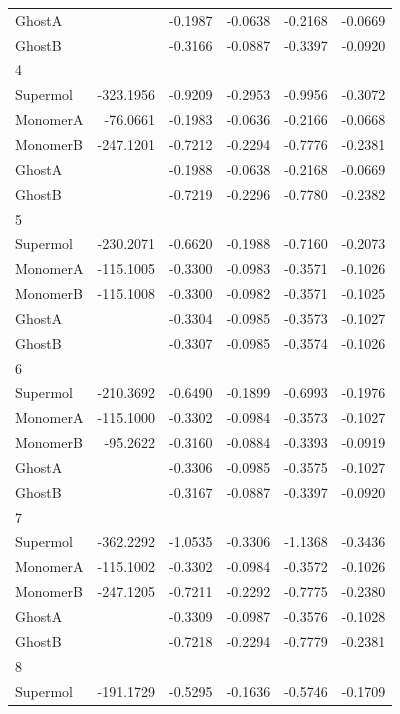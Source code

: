 \documentclass[journal=jctcce,manuscript=article]{achemso}
\begin{document}
\begin{spacing}{1}
\begin{longtable}{lRRRRR}
    GhostA &  & -0.1987 & -0.0638 & -0.2168 & -0.0669 \\
    GhostB &  & -0.3166 & -0.0887 & -0.3397 & -0.0920 \\
    4 &  &  &  &  &  \\
    Supermol & -323.1956 & -0.9209 & -0.2953 & -0.9956 & -0.3072 \\
    MonomerA & -76.0661 & -0.1983 & -0.0636 & -0.2166 & -0.0668 \\
    MonomerB & -247.1201 & -0.7212 & -0.2294 & -0.7776 & -0.2381 \\
    GhostA &  & -0.1988 & -0.0638 & -0.2168 & -0.0669 \\
    GhostB &  & -0.7219 & -0.2296 & -0.7780 & -0.2382 \\
    5 &  &  &  &  &  \\
    Supermol & -230.2071 & -0.6620 & -0.1988 & -0.7160 & -0.2073 \\
    MonomerA & -115.1005 & -0.3300 & -0.0983 & -0.3571 & -0.1026 \\
    MonomerB & -115.1008 & -0.3300 & -0.0982 & -0.3571 & -0.1025 \\
    GhostA &  & -0.3304 & -0.0985 & -0.3573 & -0.1027 \\
    GhostB &  & -0.3307 & -0.0985 & -0.3574 & -0.1026 \\
    6 &  &  &  &  &  \\
    Supermol & -210.3692 & -0.6490 & -0.1899 & -0.6993 & -0.1976 \\
    MonomerA & -115.1000 & -0.3302 & -0.0984 & -0.3573 & -0.1027 \\
    MonomerB & -95.2622 & -0.3160 & -0.0884 & -0.3393 & -0.0919 \\
    GhostA &  & -0.3306 & -0.0985 & -0.3575 & -0.1027 \\
    GhostB &  & -0.3167 & -0.0887 & -0.3397 & -0.0920 \\
    7 &  &  &  &  &  \\
    Supermol & -362.2292 & -1.0535 & -0.3306 & -1.1368 & -0.3436 \\
    MonomerA & -115.1002 & -0.3302 & -0.0984 & -0.3572 & -0.1026 \\
    MonomerB & -247.1205 & -0.7211 & -0.2292 & -0.7775 & -0.2380 \\
    GhostA &  & -0.3309 & -0.0987 & -0.3576 & -0.1028 \\
    GhostB &  & -0.7218 & -0.2294 & -0.7779 & -0.2381 \\
    8 &  &  &  &  &  \\
    Supermol & -191.1729 & -0.5295 & -0.1636 & -0.5746 & -0.1709 \\

\end{longtable}
\end{spacing}
\end{document}
